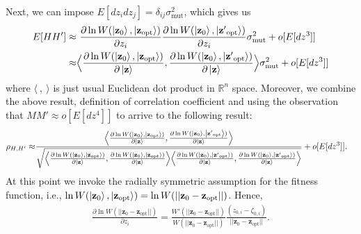 \documentclass[11pt]{article}
\begin{document}
    Next, we can impose $ E[dz_i dz_j] = \delta_{ij} \sigma_{\mathrm{mut}}^2$, which gives us
    \begin{align*}
         E[HH'] \approx&\  \frac{\partial \ln W(\ket{\mathbf{z}_0}, \ket{\mathbf{z}_{\mathrm{opt}}})}{\partial z_i} \frac{\partial \ln W(\ket{\mathbf{z}_0},\ket{\mathbf{z'}_{\mathrm{opt}}})}{\partial z_i}   \sigma_{\mathrm{mut}}^2 + o[E[dz^3]] \\
         \approx& \Big\langle \frac{\partial \ln W(\ket{\mathbf{z}_0}, \ket{\mathbf{z}_{\mathrm{opt}}})}{\partial \ket{\mathbf{z}}},  \frac{\partial \ln W(\ket{\mathbf{z}_0},\ket{\mathbf{z'}_{\mathrm{opt}}})}{\partial \ket{\mathbf{z}}} \Big\rangle \sigma_{\mathrm{mut}}^2 + o[E[dz^3]]
    \end{align*}
    where $\langle \ , \ \rangle$ is just usual Euclidean dot product in $\mathbb{R}^n$ space. Moreover, we combine the above result, definition of correlation coefficient and using the observation that $MM' \approx o[E[dz^4]]$ to arrive to the following result:
    \begin{align*}
        \rho_{H,H'} \approx& \frac{\Big\langle \frac{\partial \ln W(\ket{\mathbf{z}_0}, \ket{\mathbf{z}_{\mathrm{opt}}})}{\partial \ket{\mathbf{z}}},  \frac{\partial \ln W(\ket{\mathbf{z}_0},\ket{\mathbf{z'}_{\mathrm{opt}}})}{\partial \ket{\mathbf{z}}} \Big\rangle}{\sqrt{\Big\langle \frac{\partial \ln W(\ket{\mathbf{z}_0}, \ket{\mathbf{z}_{\mathrm{opt}}})}{\partial \ket{\mathbf{z}}},  \frac{\partial \ln W(\ket{\mathbf{z}_0},\ket{\mathbf{z}_{\mathrm{opt}}})}{\partial \ket{\mathbf{z}}} \Big\rangle\Big\langle \frac{\partial \ln W(\ket{\mathbf{z}_0}, \ket{\mathbf{z'}_{\mathrm{opt}}})}{\partial \ket{\mathbf{z}}},  \frac{\partial \ln W(\ket{\mathbf{z}_0},\ket{\mathbf{z'}_{\mathrm{opt}}})}{\partial \ket{\mathbf{z}}} \Big\rangle}} + o[E[dz^3]] .
    \end{align*}
    At this point we invoke the radially symmetric assumption for the fitness function, i.e., $\ln W(\ket{\mathbf{z}_0},\ket{\mathbf{z}_{\mathrm{opt}}}) = \ln W(||\mathbf{z}_0 - \mathbf{z}_{\mathrm{opt}} ||)$. Hence, 
    \begin{align*}
        \frac{\partial \ln W(||\mathbf{z}_0 - \mathbf{z}_{\mathrm{opt}} ||)}{\partial z_i} 
        = \frac{W'(||\mathbf{z}_0 - \mathbf{z}_{\mathrm{opt}} ||)}{W(||\mathbf{z}_0 - \mathbf{z}_{\mathrm{opt}} ||)} \frac{(z_{0,i}-\zeta_{0,i})}{||\mathbf{z}_0 - \mathbf{z}_{\mathrm{opt}} ||}.
    \end{align*}
\end{document}
